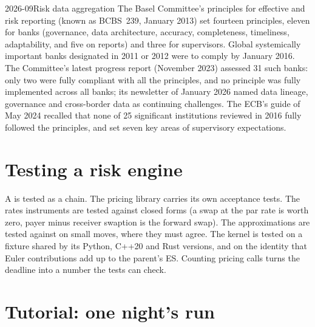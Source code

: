 \begin{dated}{2026-09}{Risk data aggregation}\label{dat:rc:build-a-risk-engine:bcbs239}
The Basel Committee's principles for effective  and risk reporting (known as
BCBS~239, January 2013) set fourteen principles, eleven for banks (governance, data architecture,
accuracy, completeness, timeliness, adaptability, and five on reports) and three for supervisors. Global
systemically important banks designated in 2011 or 2012 were to comply by January 2016. The Committee's
latest progress report (November 2023) assessed 31 such banks: only two were fully compliant with all the
principles, and no principle was fully implemented across all banks; its newsletter of January 2026 named
data lineage, governance and cross-border data as continuing challenges. The ECB's guide of May 2024
recalled that none of 25 significant institutions reviewed in 2016 fully followed the principles, and set
seven key areas of supervisory expectations.
\end{dated}

\section{Testing a risk engine}

A  is tested as a chain. The pricing library carries its own acceptance tests. The rates
instruments are tested against closed forms (a swap at the par rate is worth zero, payer minus receiver
swaption is the forward swap). The approximations are tested against  on small moves, where
they must agree. The kernel is tested on a fixture shared by its Python, C++20 and Rust versions, and on
the identity that Euler contributions add up to the parent's ES. Counting pricing calls turns the deadline
into a number the tests can check.

\section{Tutorial: one night's run}\label{tut:rc:build-a-risk-engine:tutorial}

